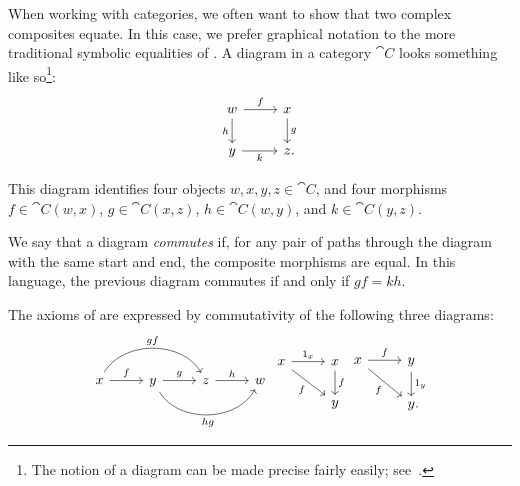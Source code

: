 

\noindent
When working with categories, we often want to show that two complex composites
equate. In this case, we prefer graphical notation to the more traditional
symbolic equalities of . A
diagram in a category $\cat{C}$ looks something like so\footnote{
  The notion of a diagram can be made precise fairly easily; see~\cite[subsection 1.6]{riehl-2017}.
}:
\[
  \begin{tikzcd}
    w\ar[r, "f"]\ar[d, "h"'] & x\ar[d, "g"] \\
    y\ar[r, "k"'] & z\punctuation{.}
  \end{tikzcd}
\]

This diagram identifies four objects $w,x,y,z\in\cat{C}$, and four morphisms
$f\in\cat{C}(w, x)$, $g\in\cat{C}(x, z)$, $h\in\cat{C}(w, y)$, and
$k\in\cat{C}(y, z)$.

We say that a diagram \emph{commutes} if, for any pair of paths
through the diagram with the same start and end, the composite morphisms are
equal. In this language, the previous diagram commutes if and only if $gf = kh$.

\begin{ex}
	The axioms of  are expressed by commutativity of the
	following three diagrams:
  \[
		\begin{tikzcd}
			x\ar[r, "f"]\ar[rr, "gf", bend left=60] &
			y\ar[r, "g"]\ar[rr, "hg"', bend right=60] &
			z\ar[r, "h"] & w
		\end{tikzcd}
		\begin{tikzcd}
			x\ar[r, "1_x"]\ar[rd, "f"'] & x\ar[d, "f"] \\
			& y
		\end{tikzcd}
		\begin{tikzcd}
			x\ar[r, "f"]\ar[rd, "f"'] & y\ar[d, "1_y"] \\
			& y\punctuation{.}
		\end{tikzcd}
  \]
\end{ex}

